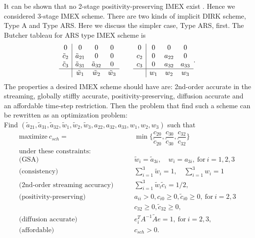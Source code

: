 It can be shown that no 2-stage positivity-preserving IMEX exist \cite{hu_etal_2018}.
Hence we considered 3-stage IMEX scheme.
There are two kinds of implicit DIRK scheme, Type A and Type ARS.
Here we discuss the simpler case, Type ARS, first.
The Butcher tableau for ARS type IMEX scheme is
\begin{equation}
  \begin{array}{c | c c c}
  	         0           & 0                    & 0                    & 0                    \\
  	\tilde{c}_{2} & \tilde{a}_{21}       & 0                    & 0                    \\
  	\tilde{c}_{3} & \tilde{a}_{31}       & \tilde{a}_{32}       & 0                    \\ \hline
  	                     & \tilde{w}_{1} & \tilde{w}_{2} & \tilde{w}_{3}
  \end{array}
  \qquad
  \begin{array}{c | c c c}
  	     0       & 0            & 0            & 0            \\
  	c_{2} & 0            & a_{22}       & 0            \\
  	c_{3} & 0            & a_{32}       & a_{33}       \\ \hline
  	             & w_{1} & w_{2} & w_{3}
  \end{array}.
\end{equation}
The properties a desired IMEX scheme should have are: 2nd-order accurate in the streaming, globally stiffly accurate, positivity-preserving, diffusion accurate and an affordable time-step restriction.
Then the problem that find such a scheme can be rewritten as an optimization problem:\\
Find $(\tilde{a}_{21}, \tilde{a}_{31}, \tilde{a}_{32}, \tilde{w}_{1}, \tilde{w}_{2}, \tilde{w}_{3}, a_{22}, a_{32}, a_{33}, w_{1}, w_{2}, w_{3})$ such that
\begin{align*}
\text{maximize} ~ c_{sch} = &\min \{ \dfrac{c_{20}}{\tilde{c}_{20}}, \dfrac{c_{30}}{\tilde{c}_{30}}, \dfrac{c_{32}}{\tilde{c}_{32}}\}\\
 \text{under these constraints:} \qquad & \\
 \text{(GSA)} \qquad\ &\tilde{w}_{i} = \tilde{a}_{3i}, \quad w_{i} = a_{3i}, ~\text{for} ~ i = 1,2,3\\
 \text{(consistency)} \qquad\ & \sum_{i=1}^{3}  \tilde{w}_{i} = 1, \quad \sum_{i=1}^{3} w_{i} = 1\\ 
 \text{(2nd-order streaming accuracy)} \qquad\ & \sum_{i=1}^{3}  \tilde{w}_{i}\tilde{c}_{i} = 1/2, \\
 \text{(positivity-preserving)} \qquad & a_{ii} > 0, c_{i0} \geq 0, \tilde{c}_{i0} \geq 0, ~\text{for} ~ i = 2,3 \\
 & c_{32} \geq 0, \tilde{c}_{32} \geq 0, \\
 \text{(diffusion accurate)} \qquad & e^{T}_iA^{-1}\tilde{A}e = 1, ~\text{for} ~ i = 2,3, \\
 \text{(affordable)} \qquad & c_{sch} > 0.
\end{align*}
